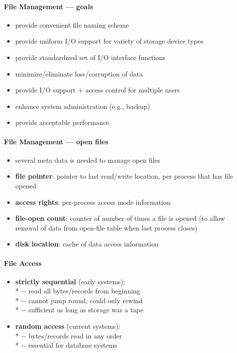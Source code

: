 \paragraph{File Management --- goals}
\begin{itemize}
  \item provide convenient file naming scheme
  \item provide uniform I/O support for variety of storage device types
  \item provide standardized set of I/O interface functions
  \item minimize/eliminate loss/corruption of data
  \item provide I/O support + access control for multiple users
  \item enhance system administration (e.g., backup)
  \item provide acceptable performance
\end{itemize}

\paragraph{File Management --- open files}
\begin{itemize}
  \item several meta data is needed to manage open files
  \item \textbf{file pointer}: pointer to last read/write location, per process that has file opened
  \item \textbf{access rights}: per-process access mode information
  \item \textbf{file-open count}: counter of number of times a file is opened (to allow removal of data from open-file table when last process closes)
  \item \textbf{disk location}: cache of data access information
\end{itemize}

\paragraph{File Access}
\begin{itemize}
  \item \textbf{strictly sequential} (early systems): \\*
    $ - $ read all bytes/records from beginning \\*
    $ - $ cannot jump round, could only rewind \\*
    $ - $ sufficient as long as storage was a tape
  \item \textbf{random access} (current systems): \\*
    $ - $ bytes/records read in any order \\*
    $ - $ essential for database systems
\end{itemize}

